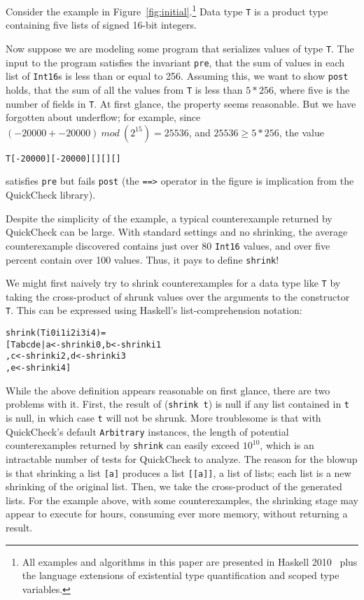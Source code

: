 \documentclass{sigplanconf}
\newenvironment{code}{\begin{alltt}\footnotesize}{\end{alltt}}
\newcommand{\ttp}[1]{\texttt{#1}}
\begin{document}
Consider the example in Figure~\ref{fig:initial}.\footnote{All examples and
  algorithms in this paper are presented in Haskell 2010~\cite{haskell2010} plus
  the language extensions of existential type quantification and scoped type
  variables.}  Data type \ttp{T} is a product type containing five lists of
signed 16-bit integers.  %

Now suppose we are modeling some program that serializes values of type \ttp{T}.
The input to the program satisfies the invariant \ttp{pre}, that the sum of
values in each list of \ttp{Int16}s is less than or equal to 256.  Assuming
this, we want to show \ttp{post} holds, that the sum of all the values from
\ttp{T} is less than $5 * 256$, where five is the number of fields in \ttp{T}.
At first glance, the property seems reasonable.  But we have forgotten about
underflow; for example, since $(-20000 + -20000) \ mod \ (2^{15}) = 25536$, and
$25536 \ge 5*256$, the value
%
\begin{code}
T [-20000] [-20000] [] [] []
\end{code}
%
\noindent
satisfies \ttp{pre} but fails \ttp{post} (the \ttp{==>} operator in the figure
is implication from the QuickCheck library).

Despite the simplicity of the example, a typical counterexample returned by
QuickCheck can be large.  With standard settings and no shrinking, the average
counterexample discovered contains just over 80 \ttp{Int16} values, and over
five percent contain over 100 values.  Thus, it pays to define
\ttp{shrink}!

We might first naively try to shrink counterexamples for a data type like
\ttp{T} by taking the cross-product of shrunk values over the arguments to the
constructor \ttp{T}.  This can be expressed using Haskell's list-comprehension
notation:
%
\begin{code}
shrink (T i0 i1 i2 i3 i4) =
  [ T a b c d e | a <- shrink i0, b <- shrink i1
                , c <- shrink i2, d <- shrink i3
                , e <- shrink i4 ]
\end{code}
%
\noindent
While the above definition appears reasonable on first glance, there are two
problems with it.  First, the result of (\ttp{shrink t}) is null if any list
contained in \ttp{t} is null, in which case \ttp{t} will not be shrunk.  More
troublesome is that with QuickCheck's default \ttp{Arbitrary} instances, the
length of potential counterexamples returned by \ttp{shrink} can easily exceed
$10^{10}$, which is an intractable number of tests for QuickCheck to analyze.
The reason for the blowup is that shrinking a list \ttp{[a]} produces a list
\ttp{[[a]]}, a list of lists; each list is a new shrinking of the original list.
Then, we take the cross-product of the generated lists.  For the example above,
with some counterexamples, the shrinking stage may appear to execute for hours,
consuming ever more memory, without returning a result.
\end{document}
